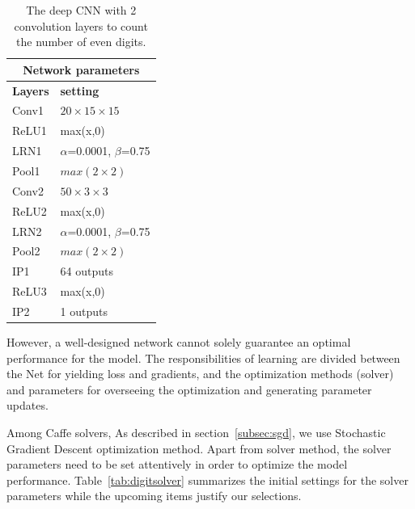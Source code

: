\begin{table}[H]
	\centering
			\caption{The deep CNN with 2 convolution layers to count the number of even digits.}
	\begin{tabular}{ |p{2cm}|p{2cm}| }
	\hline 
	\multicolumn{2}{|c|}{\textbf{Network parameters}} \\
	\hline
	\hline
	\textbf{Layers} & \textbf{setting }\\
	\hline
	Conv1 & $20\times15\times15$\\
	\hline
	ReLU1 & max(x,0)  \\
	\hline
	LRN1 & $\alpha$=0.0001, $\beta$=0.75\\
	\hline
	Pool1    & $max(2\times2)$ \\
	\hline
	Conv2 & $50\times3\times3$\\
	\hline
	ReLU2 & max(x,0)  \\
	\hline
	LRN2 & $\alpha$=0.0001, $\beta$=0.75\\
	\hline
	Pool2    & $max(2\times2)$ \\
	\hline
	IP1 & 64 outputs \\
	\hline
	ReLU3 & max(x,0)  \\
	\hline
	IP2 & 1 outputs \\
	\hline
	\end{tabular}
		\label{fig:digitnet}
\end{table}




However, a well-designed network cannot solely guarantee an optimal performance for the model. The responsibilities of learning are divided between the Net for yielding loss and gradients, and the optimization methods (solver) and parameters for overseeing the optimization and generating parameter updates. 

Among Caffe solvers, As described in section~\ref{subsec:sgd}, we use Stochastic Gradient Descent optimization method. Apart from solver method, the solver parameters need to be set attentively in order to optimize the model performance. Table~\ref{tab:digitsolver} summarizes the initial settings for the solver parameters while the upcoming items justify our selections.

